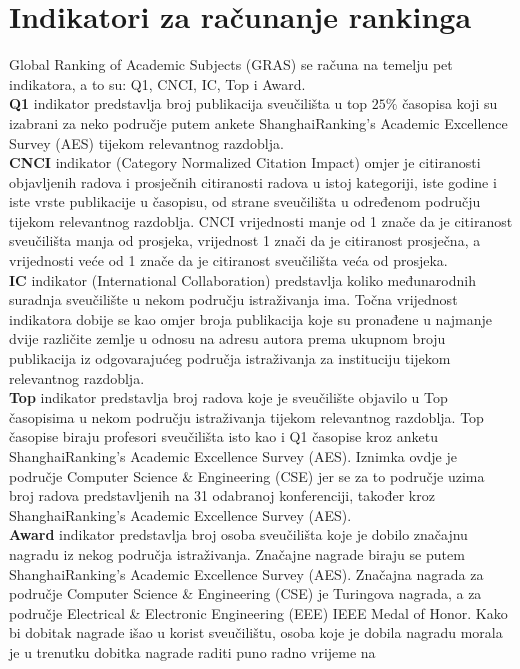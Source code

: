 \documentclass[times, utf8, zavrsni]{fer}
\begin{document}
\section{Indikatori za računanje rankinga}
Global Ranking of Academic Subjects (GRAS) se računa na temelju pet indikatora, a to su: Q1, CNCI, IC, Top i Award.
\\ \textbf{Q1} indikator predstavlja broj publikacija sveučilišta u top $25\%$ časopisa koji su izabrani za neko područje putem ankete ShanghaiRanking’s Academic Excellence Survey
(AES) tijekom relevantnog razdoblja.   
\\ \textbf{CNCI} indikator (Category Normalized Citation Impact) omjer je citiranosti objavljenih radova i prosječnih citiranosti 
radova u istoj kategoriji, iste godine i iste vrste publikacije u časopisu, od strane sveučilišta u određenom području tijekom relevantnog razdoblja.
CNCI vrijednosti manje od 1 znače da je citiranost sveučilišta manja od prosjeka, vrijednost 1 znači da je citiranost prosječna, a vrijednosti veće od
1 znače da je citiranost sveučilišta veća od prosjeka.
\\ \textbf{IC} indikator (International Collaboration) predstavlja koliko međunarodnih suradnja sveučilište u nekom području istraživanja ima.
Točna vrijednost indikatora dobije se kao omjer broja publikacija koje su pronađene u najmanje dvije različite zemlje 
u odnosu na adresu autora prema ukupnom broju publikacija iz odgovarajućeg područja istraživanja za instituciju tijekom relevantnog razdoblja.
\\ \textbf{Top} indikator predstavlja broj radova koje je sveučilište 
objavilo u Top časopisima u nekom području istraživanja tijekom relevantnog razdoblja.
Top časopise biraju profesori sveučilišta isto kao i Q1 časopise kroz anketu ShanghaiRanking’s Academic Excellence Survey (AES). 
Iznimka ovdje je područje Computer Science \& Engineering (CSE) jer se za to područje uzima broj radova predstavljenih na 31 odabranoj konferenciji, 
također kroz ShanghaiRanking’s Academic Excellence Survey (AES).
\\ \textbf{Award} indikator predstavlja broj osoba sveučilišta koje je dobilo značajnu nagradu iz nekog područja istraživanja. Značajne nagrade 
biraju se putem ShanghaiRanking’s Academic Excellence Survey (AES). Značajna nagrada za područje  Computer Science \& Engineering (CSE) je Turingova 
nagrada, a za područje Electrical \& Electronic Engineering (EEE) IEEE Medal of Honor.
Kako bi dobitak nagrade išao u korist sveučilištu, osoba koje je dobila nagradu morala je u trenutku dobitka nagrade raditi puno radno vrijeme na 
\end{document}

